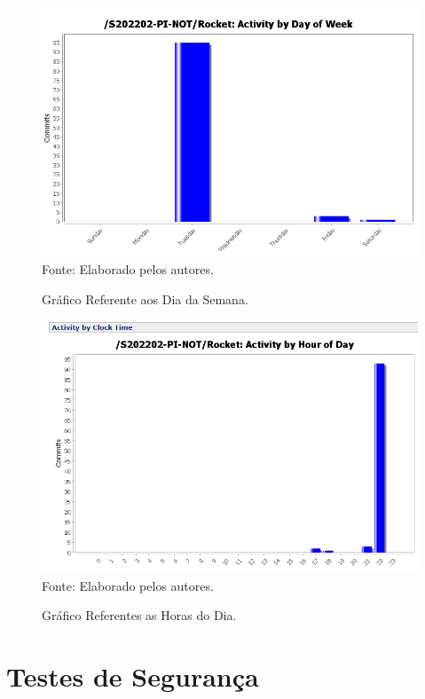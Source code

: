 \documentclass[
    12pt,               %
    openright,          %
    oneside,
    a4paper,            %
    BIBLATEX,           %
    TODO,               %
    english,            %
    brazil              %
    ]{ifsp-spo-inf-ctds}
\begin{document}
    \begin{figure}[H]
                \centering
                \caption{Gráfico Referente aos Dia da Semana.}
                \includegraphics[width=1 \textwidth]{StatSVN/DiadaSemana.png}
                {\footnotesize Fonte: Elaborado pelos autores.}
                \label{fig:diaSemana}
            \end{figure} 

    \begin{figure}[H]
                \centering
                \caption{Gráfico Referentes as Horas do Dia.}
                \includegraphics[width=1 \textwidth]{StatSVN/HoradoDia.png}
                {\footnotesize Fonte: Elaborado pelos autores.}
                \label{fig:horaDia}
            \end{figure} 

\section{Testes de Segurança}
\end{document}
